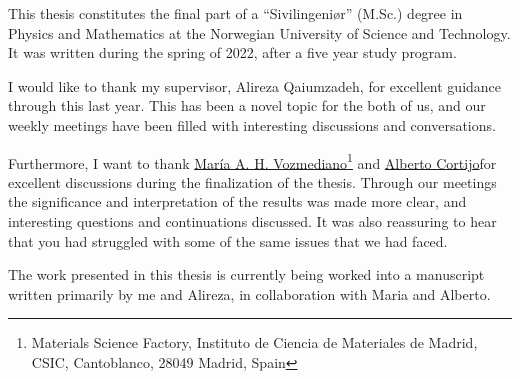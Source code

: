 This thesis constitutes the final part of a ``Sivilingeniør'' (M.Sc.) degree in Physics and Mathematics at the Norwegian University of Science and Technology.
It was written during the spring of 2022, after a five year study program.

I would like to thank my supervisor, Alireza Qaiumzadeh, for excellent guidance through this last year.
This has been a novel topic for the both of us, and our weekly meetings have been filled with interesting discussions and conversations.

Furthermore, I want to thank
\href{https://wp.icmm.csic.es/field-theories-in-condensed-matter-physics/vozmediano/}{María A. H. Vozmediano}\footnote{Materials Science Factory, Instituto de Ciencia de Materiales de Madrid, CSIC, Cantoblanco, 28049 Madrid, Spain\label{address-of-spain}}
and
\href{https://wp.icmm.csic.es/field-theories-in-condensed-matter-physics/alberto-cortijo/}{Alberto Cortijo}\footnotemark[1]
for excellent discussions during the finalization of the thesis.
Through our meetings the significance and interpretation of the results was made more clear, and interesting questions and continuations discussed.
It was also reassuring to hear that you had struggled with some of the same issues that we had faced.

The work presented in this thesis is currently being worked into a manuscript written primarily by me and Alireza, in collaboration with Maria and Alberto.
